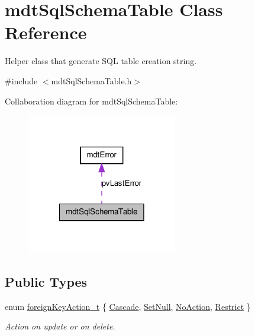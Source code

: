 \hypertarget{classmdt_sql_schema_table}{
\section{mdtSqlSchemaTable Class Reference}
\label{classmdt_sql_schema_table}
}


Helper class that generate SQL table creation string.  




{\ttfamily \#include $<$mdtSqlSchemaTable.h$>$}



Collaboration diagram for mdtSqlSchemaTable:\nopagebreak
\begin{figure}[H]
\begin{center}
\leavevmode
\includegraphics[width=186pt]{classmdt_sql_schema_table__coll__graph}
\end{center}
\end{figure}
\subsection*{Public Types}
\begin{DoxyCompactItemize}
\item 
enum \hyperlink{classmdt_sql_schema_table_a1738e443f03dc69b914edb967cb911be}{foreignKeyAction\_\-t} \{ \hyperlink{classmdt_sql_schema_table_a1738e443f03dc69b914edb967cb911bea69dd241f7f53962080a7f2ba14a8a203}{Cascade}, 
\hyperlink{classmdt_sql_schema_table_a1738e443f03dc69b914edb967cb911bea1c16892bf8fa377f987abbb4d1c5644a}{SetNull}, 
\hyperlink{classmdt_sql_schema_table_a1738e443f03dc69b914edb967cb911bea88f6f3c8088eba177e18cb26f518d61d}{NoAction}, 
\hyperlink{classmdt_sql_schema_table_a1738e443f03dc69b914edb967cb911bea63478da446745c0346acfc6f5665abfe}{Restrict}
 \}
\begin{DoxyCompactList}\small\item\em Action on update or on delete. \end{DoxyCompactList}\end{DoxyCompactItemize}
